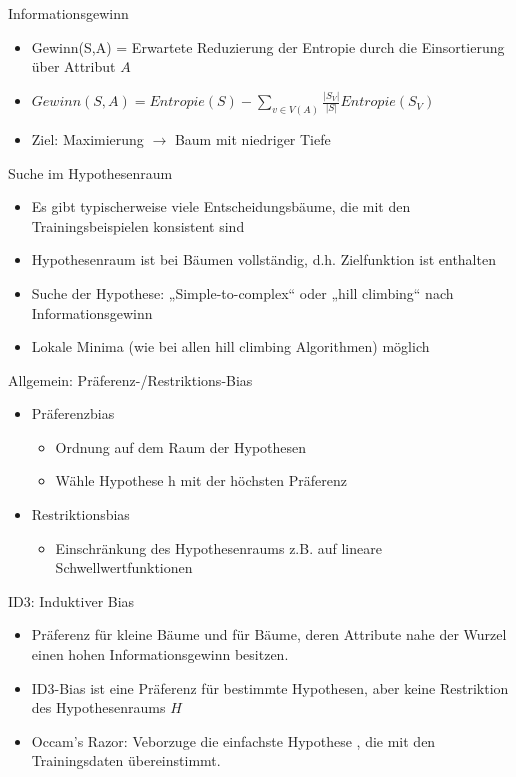 \documentclass[paper=a4, fontsize=11pt]{scrartcl} %
\numberwithin{equation}{section} %
\numberwithin{figure}{section} %
\numberwithin{table}{section} %
\begin{document}
Informationsgewinn
\begin{itemize}
\item Gewinn(S,A) = Erwartete Reduzierung der Entropie durch die Einsortierung über Attribut $A$
\item $Gewinn(S,A) = Entropie(S) - \sum\limits_{v \in V(A)} \frac{|S_V|}{|S|} Entropie(S_V)$
\item Ziel: Maximierung $\rightarrow$ Baum mit niedriger Tiefe
\end{itemize}

Suche im Hypothesenraum
\begin{itemize}
\item Es gibt typischerweise viele Entscheidungsbäume, die mit den Trainingsbeispielen konsistent sind
\item Hypothesenraum ist bei Bäumen vollständig, d.h. Zielfunktion ist enthalten
\item Suche der Hypothese: „Simple-to-complex“ oder „hill climbing“ nach Informationsgewinn
\item Lokale Minima (wie bei allen hill climbing Algorithmen) möglich
\end{itemize}

Allgemein: Präferenz-/Restriktions-Bias
\begin{itemize}
\item Präferenzbias
\begin{itemize}
\item Ordnung auf dem Raum der Hypothesen
\item Wähle Hypothese h mit der höchsten Präferenz
\end{itemize}
\item Restriktionsbias
\begin{itemize}
\item Einschränkung des Hypothesenraums z.B. auf lineare Schwellwertfunktionen
\end{itemize}
\end{itemize}

ID3: Induktiver Bias
\begin{itemize}
\item Präferenz für kleine Bäume und für Bäume, deren Attribute nahe der Wurzel einen hohen Informationsgewinn besitzen.
\item ID3-Bias ist eine Präferenz für bestimmte Hypothesen, aber keine Restriktion des Hypothesenraums $H$
\item Occam's Razor: Veborzuge die einfachste Hypothese , die mit den Trainingsdaten übereinstimmt.
\end{itemize}
\end{document}
